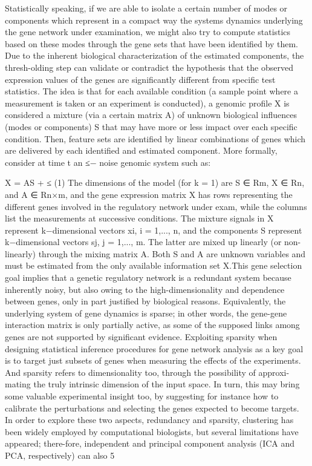 \documentclass[11pt]{article}
\begin{document}
Statistically speaking, if we are able to isolate a certain number of modes or components which represent in a compact way the systems dynamics underlying the gene network under examination, we might also try to compute statistics based on these modes through the gene sets that have been identified by them. Due to the inherent biological characterization of the estimated components, the thresh-olding step can validate or contradict the hypothesis that the observed expression values of the genes are significantly different from specific test statistics. The idea is that for each available condition (a sample point where a measurement is taken or an experiment is conducted), a genomic profile X is considered a mixture (via a certain matrix A) of unknown biological influences (modes or components) S that may have more or less impact over each specific condition. Then, feature sets are identified by linear combinations of genes which are delivered by each identified and estimated component. More formally, consider at time t an ≤− noise genomic system such as:

X = AS + ≤ (1) The dimensions of the model (for k = 1) are S ∈ Rm, X ∈ Rn, and A ∈ Rn×m, and the gene expression matrix X has rows representing the different genes involved in the regulatory network under exam, while the columns list the measurements at successive conditions. The mixture signals in X represent k−dimensional vectors xi, i = 1,..., n, and the components S represent k−dimensional vectors sj, j = 1,..., m. The latter are mixed up linearly (or non-linearly) through the mixing matrix A. Both S and A are unknown variables and must be estimated from the only available information set X.This gene selection goal implies that a genetic regulatory network is a redundant system because inherently noisy, but also owing to the high-dimensionality and dependence between genes, only in part justified by biological reasons. Equivalently, the underlying system of gene dynamics is sparse; in other words, the gene-gene interaction matrix is only partially active, as some of the supposed links among genes are not supported by significant evidence. Exploiting sparsity when designing statistical inference procedures for gene network analysis as a key goal is to target just subsets of genes when measuring the effects of the experiments. And sparsity refers to dimensionality too, through the possibility of approxi-mating the truly intrinsic dimension of the input space. In turn, this may bring some valuable experimental insight too, by suggesting for instance how to calibrate the perturbations and selecting the genes expected to become targets. In order to explore these two aspects, redundancy and sparsity, clustering has been widely employed by computational biologists, but several limitations have appeared; there-fore, independent and principal component analysis (ICA and PCA, respectively) can also 5
\end{document}
